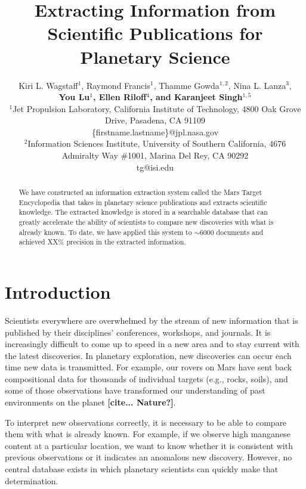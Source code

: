 \documentclass[letterpaper]{article} %
\begin{document}
%
\title{Extracting Information from Scientific Publications for
Planetary Science}
\author{
Kiri L. Wagstaff$^1$,
Raymond Francis$^1$,
Thamme Gowda$^{1,2}$,
Nina L. Lanza$^3$,\\
{\Large \bf You Lu$^1$,
Ellen Riloff$^4$, and
Karanjeet Singh$^{1,5}$}\\
$^1$Jet Propulsion Laboratory, California Institute of Technology,
4800 Oak Grove Drive, Pasadena, CA 91109\\
\{firstname.lastname\}@jpl.nasa.gov\\
$^2$Information Sciences Institute, University of Southern
California,
4676 Admiralty Way \#1001, Marina Del Rey, CA 90292\\
tg@isi.edu
}
\maketitle
\begin{abstract}
We have constructed an information extraction system called the Mars
Target Encyclopedia that takes in planetary science publications
and extracts scientific knowledge.  The extracted knowledge is stored
in a searchable database that can greatly accelerate the ability of
scientists to compare new discoveries with what is already known.  To
date, we have applied this system to $\sim$6000 documents and achieved
XX\% precision in the extracted information. 
\end{abstract}

\section{Introduction}

Scientists everywhere are overwhelmed by the stream of new information
that is published by their disciplines' conferences, workshops, and
journals.  It is increasingly difficult to come up to speed in a
new area and to stay current with the latest discoveries.  In
planetary exploration, new discoveries can occur each time
new data is transmitted.  For example, our rovers on Mars have sent
back compositional data for thousands of individual targets (e.g.,
rocks, soils), and some of those observations have transformed our
understanding of past environments on the planet {\bf
[cite... Nature?]}.

To interpret new observations correctly, it is necessary to be able to
compare them with what is already known.  For example, if we observe
high manganese content at a particular location, we want to know
whether it is consistent with previous observations or it indicates an
anomalous new discovery.  However, no central database exists in which
planetary scientists can quickly make that determination.
\end{document}
